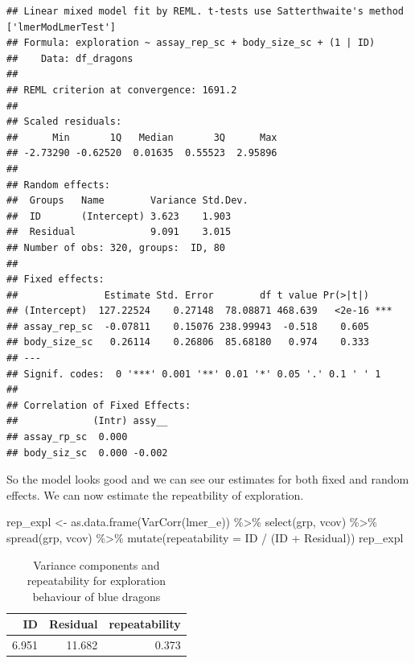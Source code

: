 \documentclass[
  12pt,
]{book}
\newenvironment{Shaded}{\begin{snugshade}}{\end{snugshade}}
\newcommand{\AttributeTok}[1]{\textcolor[rgb]{0.77,0.63,0.00}{#1}}
\newcommand{\FunctionTok}[1]{\textcolor[rgb]{0.00,0.00,0.00}{#1}}
\newcommand{\NormalTok}[1]{#1}
\newcommand{\OtherTok}[1]{\textcolor[rgb]{0.56,0.35,0.01}{#1}}
\newcommand{\SpecialCharTok}[1]{\textcolor[rgb]{0.00,0.00,0.00}{#1}}
\begin{document}
\begin{verbatim}
## Linear mixed model fit by REML. t-tests use Satterthwaite's method ['lmerModLmerTest']
## Formula: exploration ~ assay_rep_sc + body_size_sc + (1 | ID)
##    Data: df_dragons
## 
## REML criterion at convergence: 1691.2
## 
## Scaled residuals: 
##      Min       1Q   Median       3Q      Max 
## -2.73290 -0.62520  0.01635  0.55523  2.95896 
## 
## Random effects:
##  Groups   Name        Variance Std.Dev.
##  ID       (Intercept) 3.623    1.903   
##  Residual             9.091    3.015   
## Number of obs: 320, groups:  ID, 80
## 
## Fixed effects:
##               Estimate Std. Error        df t value Pr(>|t|)    
## (Intercept)  127.22524    0.27148  78.08871 468.639   <2e-16 ***
## assay_rep_sc  -0.07811    0.15076 238.99943  -0.518    0.605    
## body_size_sc   0.26114    0.26806  85.68180   0.974    0.333    
## ---
## Signif. codes:  0 '***' 0.001 '**' 0.01 '*' 0.05 '.' 0.1 ' ' 1
## 
## Correlation of Fixed Effects:
##             (Intr) assy__
## assay_rp_sc  0.000       
## body_siz_sc  0.000 -0.002
\end{verbatim}

So the model looks good and we can see our estimates for both fixed and random effects. We can now estimate the repeatbility of exploration.

\begin{Shaded}
\begin{Highlighting}[]
\NormalTok{rep\_expl }\OtherTok{\textless{}{-}} \FunctionTok{as.data.frame}\NormalTok{(}\FunctionTok{VarCorr}\NormalTok{(lmer\_e)) }\SpecialCharTok{\%\textgreater{}\%}
  \FunctionTok{select}\NormalTok{(grp, vcov) }\SpecialCharTok{\%\textgreater{}\%}
  \FunctionTok{spread}\NormalTok{(grp, vcov) }\SpecialCharTok{\%\textgreater{}\%}
  \FunctionTok{mutate}\NormalTok{(}\AttributeTok{repeatability =}\NormalTok{ ID }\SpecialCharTok{/}\NormalTok{ (ID }\SpecialCharTok{+}\NormalTok{ Residual))}
\NormalTok{rep\_expl}
\end{Highlighting}
\end{Shaded}

\begin{table}

\caption{\label{tab:unnamed-chunk-99}Variance components and repeatability for exploration
   behaviour of blue dragons}
\centering
\begin{tabular}[t]{r|r|r}
\hline
ID & Residual & repeatability\\
\hline
6.951 & 11.682 & 0.373\\
\hline
\end{tabular}
\end{table}
\end{document}
